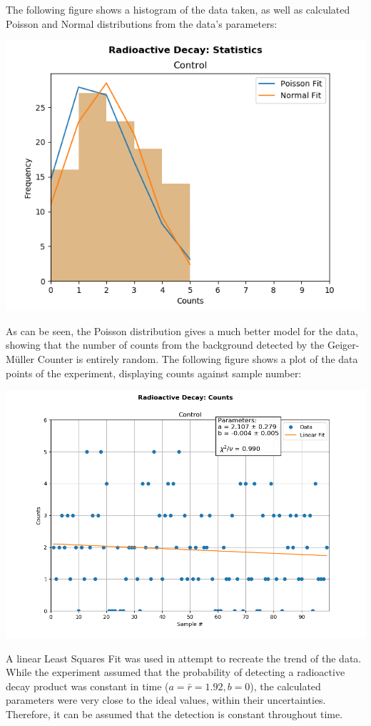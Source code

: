 \documentclass[twocolumn]{article}
\begin{document}
 The following figure shows a histogram of the data taken, as well as calculated Poisson and Normal distributions from the data's parameters:
 \centerline{\includegraphics[scale = 0.6]{fig3a}}
 
 As can be seen, the Poisson distribution gives a much better model for the data, showing that the number of counts from the background detected by 
 the Geiger-Müller Counter is entirely random.
 \vfill\eject
 The following figure shows a plot of the data points of the experiment, displaying counts against sample number:
 \centerline{\includegraphics[scale = 0.41]{fig3b}}
 A linear Least Squares Fit was used in attempt to recreate the trend of the data. While the experiment assumed that the probability of detecting a
 radioactive decay product was constant in time ($a = \bar{r} = 1.92 , b = 0$), the calculated parameters were very close to the ideal values, within their uncertainties.
 Therefore, it can be assumed that the detection is constant throughout time.
\end{document}
